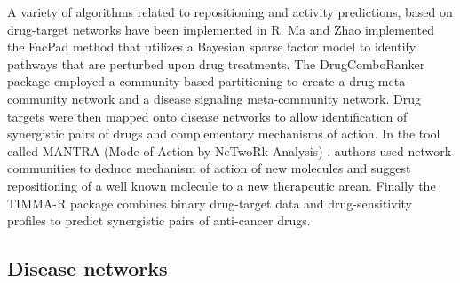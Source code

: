 \documentclass[]{book}
\begin{document}
A variety of algorithms related to repositioning and activity
predictions, based on drug-target networks have been implemented in
R. Ma and Zhao \cite{Ma:2012qy} implemented the FacPad method that
utilizes a Bayesian sparse factor model to identify pathways that are
perturbed upon drug treatments. The DrugComboRanker package
\cite{Huang:2014by} employed a community based partitioning to create
a drug meta-community network and a disease signaling meta-community
network. Drug targets were then mapped onto disease networks to allow
identification of synergistic pairs of drugs and complementary
mechanisms of action. In the tool called MANTRA (Mode of Action by
NeTwoRk Analysis) \cite{iorio2010discovery}, authors used network
communities to deduce mechanism of action of new molecules and suggest
repositioning of a well known molecule to a new therapeutic
arean. Finally the TIMMA-R package \cite{He:2015ly} combines binary
drug-target data and drug-sensitivity profiles to predict synergistic
pairs of anti-cancer drugs.



\subsection{Disease networks}
\label{sec:disease-networks}
\end{document}
